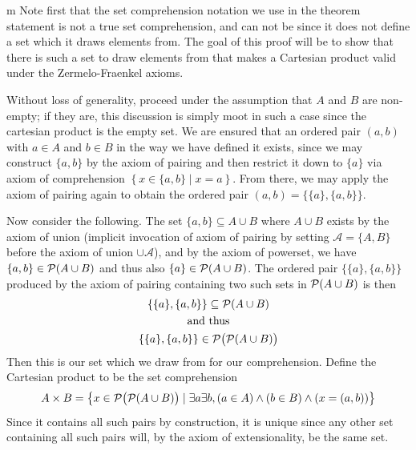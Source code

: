 \documentclass[11pt]{article}
\begin{document}
\begin{my proof}{m}
Note first that the set comprehension notation we use in the theorem statement is not a true set comprehension, and can not be since it does not define a set which it draws elements from. The goal of this proof will be to show that there is such a set to draw elements from that makes a Cartesian product valid under the Zermelo-Fraenkel axioms.

Without loss of generality, proceed under the assumption that $A$ and $B$ are non-empty; if they are, this discussion is simply moot in such a case since the cartesian product is the empty set. We are ensured that an ordered pair $(a,b)$ with $a \in A$ and $b \in B$ in the way we have defined it exists, since we may construct $\{a,b\}$ by the axiom of pairing and then restrict it down to $\{a\}$ via axiom of comprehension $\left\{ x \in \{a,b\}\mid x = a\right\}$. From there, we may apply the axiom of pairing again to obtain the ordered pair $(a,b) = \{\{a\},\{a,b\}\}$.

Now consider the following. The set $\{a,b\} \subseteq A \cup B$ where $A \cup B$ exists by the axiom of union (implicit invocation of axiom of pairing by setting $\mathcal{A}=\{A,B\}$ before the axiom of union $\cup \mathcal{A}$), and by the axiom of powerset, we have $\{a,b\} \in \mathcal{P}(A \cup B)$ and thus also $\{a\} \in \mathcal{P}(A \cup B)$. The ordered pair $\{\{a\},\{a,b\}\}$ produced by the axiom of pairing containing two such sets in $\mathcal{P}(A\cup B)$ is then \begin{gather*}
\{\{a\},\{a,b\}\} \subseteq \mathcal{P}(A \cup B) \\
\text{and thus} \\
\{\{a\},\{a,b\}\} \in \mathcal{P}\big(\mathcal{P}(A \cup B) \big)
\end{gather*}
Then this is our set which we draw from for our comprehension. Define the Cartesian product to be the set comprehension \begin{gather*}
A \times B = \left\{ x \in \mathcal{P}\big( \mathcal{P}( A\cup B )\big)\mid \exists a\exists b, (a \in A) \wedge (b \in B) \wedge (x = (a,b))\right\}
\end{gather*}
Since it contains all such pairs by construction, it is unique since any other set containing all such pairs will, by the axiom of extensionality, be the same set.
\end{my proof}
\end{document}
